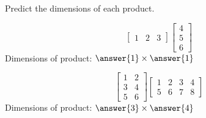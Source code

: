 \documentclass{ximera}
\begin{document}
\begin{problem}
Predict the dimensions of each product.
\begin{problem}\label{prob:matproddim1}
$$\begin{bmatrix}1&2&3\end{bmatrix}\begin{bmatrix}4\\5\\6\end{bmatrix}$$
Dimensions of product: $\answer{1}\times \answer{1}$
\end{problem}
\begin{problem}\label{prob:matproddim2}
$$\begin{bmatrix}1&2\\3&4\\5&6\end{bmatrix}\begin{bmatrix}1&2&3&4\\5&6&7&8\end{bmatrix}$$
Dimensions of product: $\answer{3}\times \answer{4}$
\end{problem}
\end{problem}
\end{document}
